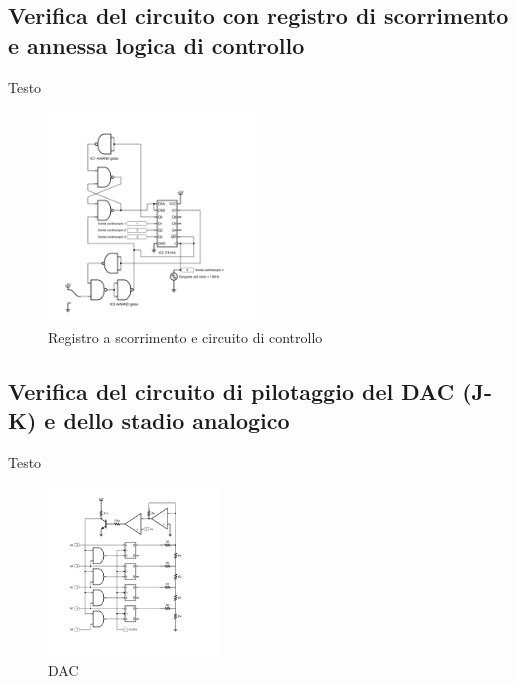 \documentclass[journal]{IEEEtran}
\begin{document}
\subsection{Verifica del circuito con registro di scorrimento e annessa logica di controllo}
Testo

\begin{figure}[H]%
\begin{center}
\includegraphics[width=0.50\textwidth]{sch-simulations/digital/output/shift-register.pdf}
\caption{Registro a scorrimento e circuito di controllo}
\label{fig:circuit_shift_register}
\end{center}
\end{figure}

\subsection{Verifica del circuito di pilotaggio del DAC (J-K) e dello stadio analogico}
Testo

\begin{figure}[H]%
\begin{center}
\includegraphics[width=0.40\textwidth]{sch-simulations/digital/output/DAC.pdf}
\caption{DAC}
\label{fig:circuit_DAC}
\end{center}
\end{figure}
\end{document}
